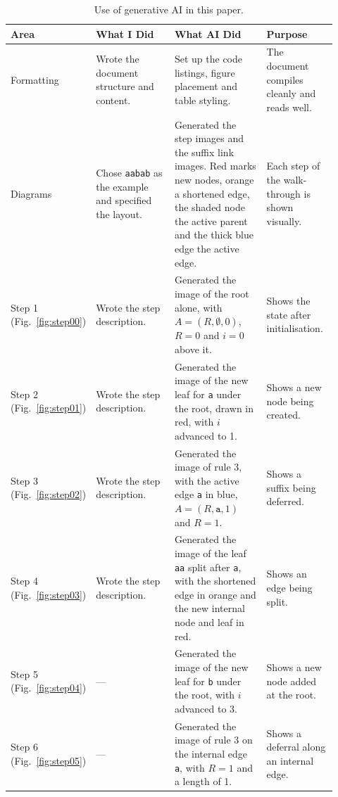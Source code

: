 \documentclass{article}
\begin{document}
	\begin{table}[H]
		\centering
		\caption{Use of generative AI in this paper.}
		\label{tab:ai-use}
		\scriptsize
		\setlength{\tabcolsep}{3.5pt}
		\renewcommand{\arraystretch}{1.25}
		\setlength{\aboverulesep}{0pt}
		\setlength{\belowrulesep}{0pt}
		\begin{tabular}{
				>{\raggedright\arraybackslash}p{0.14\linewidth}
				>{\raggedright\arraybackslash}p{0.26\linewidth}
				>{\raggedright\arraybackslash}p{0.30\linewidth}
				>{\raggedright\arraybackslash}p{0.22\linewidth}}
			\toprule
			\rowcolor{blue!15}
			Area & What I Did & What AI Did & Purpose \\
			\midrule
			Formatting & Wrote the document structure and content. & Set up the code listings, figure placement and table styling. & The document compiles cleanly and reads well. \\
			Diagrams & Chose \texttt{aabab} as the example and specified the layout. & Generated the step images and the suffix link images. Red marks new nodes, orange a shortened edge, the shaded node the active parent and the thick blue edge the active edge. & Each step of the walk-through is shown visually. \\
			Step 1 (Fig.~\ref{fig:step00}) & Wrote the step description. & Generated the image of the root alone, with $A = (R, \emptyset, 0)$, $R = 0$ and $i = 0$ above it. & Shows the state after initialisation. \\
			Step 2 (Fig.~\ref{fig:step01}) & Wrote the step description. & Generated the image of the new leaf for \texttt{a} under the root, drawn in red, with $i$ advanced to 1. & Shows a new node being created. \\
			Step 3 (Fig.~\ref{fig:step02}) & Wrote the step description. & Generated the image of rule 3, with the active edge \texttt{a} in blue, $A = (R, \texttt{a}, 1)$ and $R = 1$. & Shows a suffix being deferred. \\
			Step 4 (Fig.~\ref{fig:step03}) & Wrote the step description. & Generated the image of the leaf \texttt{aa} split after \texttt{a}, with the shortened edge in orange and the new internal node and leaf in red. & Shows an edge being split. \\
			Step 5 (Fig.~\ref{fig:step04}) & --- & Generated the image of the new leaf for \texttt{b} under the root, with $i$ advanced to 3. & Shows a new node added at the root. \\
			Step 6 (Fig.~\ref{fig:step05}) & --- & Generated the image of rule 3 on the internal edge \texttt{a}, with $R = 1$ and a length of 1. & Shows a deferral along an internal edge. \\

\end{tabular}
\end{table}
\end{document}
